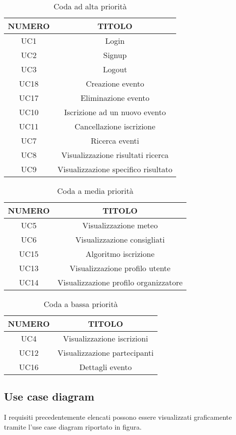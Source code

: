 \begin{table}
\begin{center}
\begin{tabular}{ |c|c|}
 \hline
 \textbf{NUMERO}& \textbf{TITOLO} \\ \hline
 UC1& Login\\ \hline
 UC2& Signup\\ \hline
 UC3& Logout\\ \hline
 UC18& Creazione evento\\ \hline
 UC17& Eliminazione evento\\ \hline
 UC10 & Iscrizione ad un nuovo evento\\ \hline
 UC11 & Cancellazione iscrizione\\ \hline
 UC7 & Ricerca eventi \\ \hline
 UC8 & Visualizzazione risultati ricerca \\ \hline
 UC9 & Visualizzazione specifico risultato \\ \hline
\end{tabular}
  \caption{Coda ad alta priorità}
  \label{tab: alta-priorità}
\end{center}
\end{table}

\begin{table}
\begin{center}
\begin{tabular}{ |c|c|}
 \hline
 \textbf{NUMERO}& \textbf{TITOLO} \\ \hline
 UC5& Visualizzazione meteo\\ \hline
 UC6& Visualizzazione consigliati\\ \hline
 UC15&Algoritmo iscrizione\\ \hline
 UC13&Visualizzazione profilo utente\\ \hline
 UC14&Visualizzazione profilo organizzatore\\ \hline
\end{tabular}
  \caption{Coda a media priorità}
  \label{tab: media-priorità}
\end{center}
\end{table}

\begin{table}
\begin{center}
\begin{tabular}{ |c|c|}
 \hline
 \textbf{NUMERO}& \textbf{TITOLO} \\ \hline
 UC4& Visualizzazione iscrizioni\\ \hline
 UC12& Visualizzazione partecipanti\\ \hline
 UC16& Dettagli evento\\ \hline
\end{tabular}
  \caption{Coda a bassa priorità}
  \label{tab: bassa-priorità}
\end{center}
\end{table}

\clearpage
\subsection{Use case diagram}
I requisiti precedentemente elencati possono essere visualizzati graficamente tramite l'use case diagram riportato in figura.

